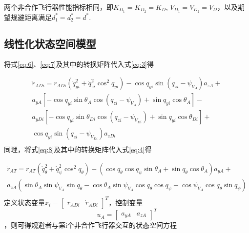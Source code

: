 \begin{assumption}
两个非合作飞行器性能指标相同，即${K_{{D_1}}} = {K_{{D_2}}} = {K_D}$, ${V_{{D_1}}} = {V_{{D_2}}} = {V_D}$，以及期望规避距离满足$d_1^* = d_2^* = {d^*}$.
\end{assumption}
\subsection{线性化状态空间模型}
将式\eqref{eq:6}、\eqref{eq:7}及其中的转换矩阵代入式\eqref{eq:3}得

\begin{equation}
\label{eq:10}
\begin{gathered}
  {{\ddot r}_{ADi}} = {r_{ADi}}\left( {\dot q_{yi}^2 + \dot q_{zi}^2{{\cos }^2}{q_{yi}}} \right) - \cos {q_{yi}}\sin \left( {{q_{zi}} - {\psi _{{V_A}}}} \right){a_{zA}} +  \\ 
  {a_{yA}}\left[ { - \cos {q_{yi}}\sin {\theta _A}\cos \left( {{q_{zi}} - {\psi _{{V_A}}}} \right) + \sin {q_{yi}}\cos {\theta _A}} \right] -  \\ 
  {a_{yDi}}\left[ { - \cos {q_{yi}}\sin {\theta _{Di}}\cos \left( {{q_{zi}} - {\psi _{{V_{Di}}}}} \right) + \sin {q_{yi}}\cos {\theta _{Di}}} \right] +  \\ 
  \cos {q_{yi}}\sin \left( {{q_{zi}} - {\psi _{{V_{Di}}}}} \right){a_{zDi}} \\ 
\end{gathered}
\end{equation}
同理，将式\eqref{eq:8}及其中的转换矩阵代入式\eqref{eq:4}得

\begin{equation}
\label{eq:11}
\begin{gathered}
  {{\ddot r}_{AT}} = {r_{AT}}\left( {\dot q_\theta ^2 + \dot q_\psi ^2{{\cos }^2}{q_\theta }} \right) + (\cos {q_\theta }\cos {q_\psi }\sin {\theta _A} + \sin {q_\theta }\cos {\theta _A}){a_{yA}} +  \\ 
  {a_{zA}}(\sin {\theta _A}\sin {\psi _{{V_A}}}\sin {q_\theta } - \cos {\theta _A}\sin {\psi _{{V_A}}}\cos {q_\theta }\cos {q_\psi } - \cos {\psi _{{V_A}}}\cos {q_\theta }\sin {q_\psi }) \\ 
\end{gathered}
\end{equation}
定义状态变量${x_i} = {\left[ {\begin{array}{*{20}{c}}
  {{r_{ADi}}}&{{{\dot r}_{ADi}}} 
\end{array}} \right]^T}$，控制变量\[{u_A} = {\left[ {\begin{array}{*{20}{c}}
  {{a_{yA}}}&{{a_{zA}}} 
\end{array}} \right]^T}\]，则可得规避者与第i个非合作飞行器交互的状态空间方程

